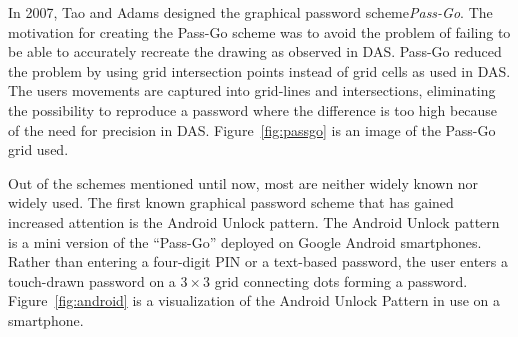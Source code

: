     \begin{figure}[H]
      \centering
    \end{figure}
    
  In 2007, Tao and Adams \cite{Tao} designed the graphical password scheme{\it Pass-Go}. The motivation for creating the Pass-Go scheme was to avoid the problem of failing to be able to accurately recreate the drawing as observed in DAS. Pass-Go reduced the problem by using grid intersection points instead of grid cells as used in DAS. The users movements are captured into grid-lines and intersections, eliminating the possibility to reproduce a password where the difference is too high because of the need for precision in DAS. Figure~\ref{fig:passgo} is an image of the Pass-Go grid used.

  Out of the schemes mentioned until now, most are neither widely known nor widely used. The first known graphical password scheme that has gained increased attention is the Android Unlock pattern. The Android Unlock pattern is a mini version of the ``Pass-Go'' deployed on Google Android smartphones. Rather than entering a four-digit PIN or a text-based password, the user enters a touch-drawn password on a $3\times3$ grid connecting dots forming a password. Figure~\ref{fig:android} is a visualization of the Android Unlock Pattern in use on a smartphone.

